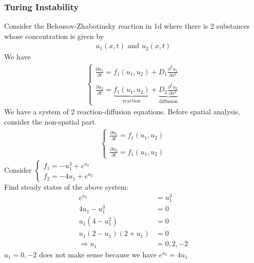 \documentclass[12pt, letterpaper]{article}
\begin{document}
\subsubsection{Turing Instability}
Consider the Belousov-Zhabotinsky reaction in 1d where there is 2 substances whose 
concentration is given by 
\begin{align*}
    u_1(x,t) \text{ and } u_2(x,t)
\end{align*}
We have 
\begin{align*}
    \begin{cases}
        \displaystyle\frac{\partial u_1}{\partial t} = f_1(u_1,u_2) + D_1 \frac{\partial^2u_1}{\partial x^2} \\ \\
        \displaystyle\frac{\partial u_2}{\partial t} = \underbrace{f_1(u_1,u_2)}_{\text{reaction}} + \underbrace{D_2 \frac{\partial^2u_2}{\partial x^2}}_{\text{diffusion}}
    \end{cases}
\end{align*}
We have a system of 2 reaction-diffusion equations. Before spatial analysis, 
consider the non-spatial part.
\begin{align*}
    \begin{cases}
        \displaystyle\frac{\partial u_1}{\partial t} = f_1(u_1,u_2) \\ \\
        \displaystyle\frac{\partial u_2}{\partial t} = f_1(u_1,u_2)
    \end{cases}
\end{align*}
 Consider $\begin{cases}
f_1 = - u_1^3 + e^{u_2} \\
f_2 = -4 u_1 + e^{u_2}
\end{cases}$ \\
Find steady states of the above system:
\begin{align*}
    e^{u_2} &= u_1^3 \\
    4u_1 - u^3_1 &= 0 \\
    u_1(4-u_1^2) &= 0 \\
    u_1(2-u_1)(2+u_1) &= 0 \\
    \Rightarrow u_1 &= 0,2,-2
\end{align*}
$u_1 = 0,-2$ does not make sense because we have $e^{u_2} = 4u_1$
\end{document}
